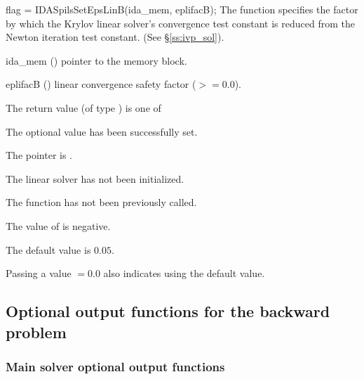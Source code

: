 {
  flag = IDASpilsSetEpsLinB(ida\_mem, eplifacB);
}
{
  The function  specifies the factor by
  which the Krylov linear solver's convergence test constant is reduced
  from the Newton iteration test constant. (See \S\ref{ss:ivp_sol}).
}
{
  \begin{args}
  \item[ida\_mem] ()
    pointer to the {\idas} memory block.
  \item[eplifacB] ()
    linear convergence safety factor ($>= 0.0$).
  \end{args}
}
{
  The return value  (of type ) is one of
  \begin{args}
  \item[\Id{IDASPILS\_SUCCESS}] 
    The optional value has been successfully set.
  \item[\Id{IDASPILS\_MEM\_NULL}]
    The  pointer is .
  \item[\Id{IDASPILS\_LMEM\_NULL}]
    The {\idaspils} linear solver has not been initialized.
  \item[\Id{IDASPILS\_NO\_ADJ}]
    The function  has not been previously called.
  \item[\Id{IDASPILS\_ILL\_INPUT}]
    The value of  is negative.
  \end{args}
}
{
  The default value is $0.05$.

  Passing a value $ = 0.0$ also indicates using the default value.
}


\subsection{Optional output functions for the backward problem}
\label{ss:optional_output_b}

\subsubsection{Main solver optional output functions}


